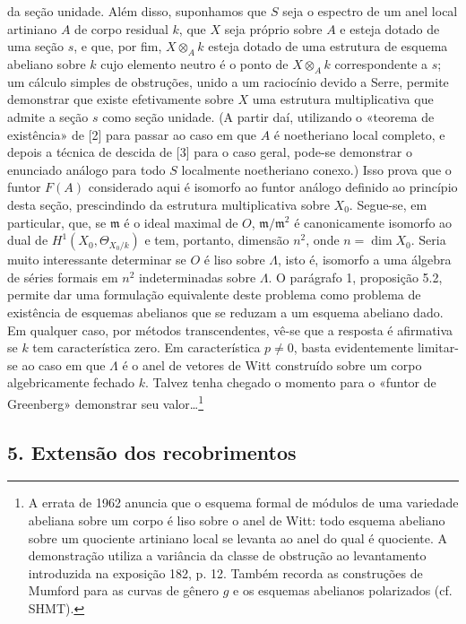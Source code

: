 da seção unidade. Além disso, suponhamos que $S$ seja o espectro de um anel
local artiniano $A$ de corpo residual $k$, que $X$ seja próprio sobre $A$ e esteja
dotado de uma seção $s$, e que, por fim, $X\otimes_Ak$ esteja dotado de uma
estrutura de esquema abeliano sobre $k$ cujo elemento neutro é o ponto de
$X\otimes_Ak$ correspondente a $s$; um cálculo simples de obstruções,
unido a um raciocínio devido a Serre, permite demonstrar que existe
efetivamente sobre $X$ uma estrutura multiplicativa que admite a seção
$s$ como seção unidade. (A partir daí, utilizando o «teorema de
existência» de [2] para passar ao caso em que $A$ é noetheriano local completo,
e depois a técnica de descida de [3] para o caso geral, pode-se demonstrar
o enunciado análogo para todo $S$ localmente noetheriano conexo.) Isso prova
que o funtor $F(A)$ considerado aqui é isomorfo ao funtor análogo definido ao
princípio desta seção, prescindindo da estrutura multiplicativa sobre
$X_0$. Segue-se, em particular, que, se $\mathfrak m$ é o ideal maximal de
$O$, $\mathfrak m/\mathfrak m^2$ é canonicamente isomorfo ao dual de
$H^1(X_0,\Theta_{X_0/k})$ e tem, portanto, dimensão $n^2$, onde
$n=\dim X_0$. Seria muito interessante determinar se $O$ é liso sobre $\Lambda$,
isto é, isomorfo a uma álgebra de séries formais em $n^2$ indeterminadas
sobre $\Lambda$. O parágrafo 1, proposição 5.2, permite dar uma formulação
equivalente deste problema como problema de existência de esquemas abelianos
que se reduzam a um esquema abeliano dado. Em qualquer caso, por métodos
transcendentes, vê-se que a resposta é afirmativa se $k$ tem característica
zero. Em característica $p\ne0$, basta evidentemente limitar-se ao caso em que
$\Lambda$ é o anel de vetores de Witt construído sobre um corpo
algebricamente fechado $k$. Talvez tenha chegado o momento para o «funtor
de Greenberg» demonstrar seu valor\ldots\footnote{A errata de 1962
anuncia que o esquema formal de módulos de uma variedade abeliana sobre um
corpo é liso sobre o anel de Witt: todo esquema abeliano sobre um quociente
artiniano local se levanta ao anel do qual é quociente. A demonstração
utiliza a variância da classe de obstrução ao levantamento introduzida na
exposição 182, p. 12. Também recorda as construções de Mumford para
as curvas de gênero $g$ e os esquemas abelianos polarizados (cf. SHMT).}

\subsection*{5. Extensão dos recobrimentos}

